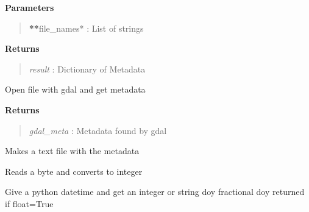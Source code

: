 \documentclass[letterpaper,10pt,english]{sphinxmanual}
\begin{document}
\begin{fulllineitems}
\begin{fulllineitems}
\textbf{Parameters}
\begin{quote}

{\color{red}\bfseries{}**}file\_names* : List of strings
\end{quote}

\textbf{Returns}
\begin{quote}

\emph{result}     : Dictionary of Metadata
\end{quote}

\end{fulllineitems}


\begin{fulllineitems}
\label{code:Metadata.Metadata.getgdalmeta}
Open file with gdal and get metadata

\textbf{Returns}
\begin{quote}

\emph{gdal\_meta} : Metadata found by gdal
\end{quote}

\end{fulllineitems}


\begin{fulllineitems}
\label{code:Metadata.Metadata.saveMetaFile}
Makes a text file with the metadata

\end{fulllineitems}


\end{fulllineitems}


\begin{fulllineitems}
\label{code:Metadata.byte2int}
Reads a byte and converts to integer

\end{fulllineitems}


\begin{fulllineitems}
\label{code:Metadata.date2doy}
Give a python datetime and get an integer or string doy fractional doy returned if float=True

\end{fulllineitems}
\end{document}
